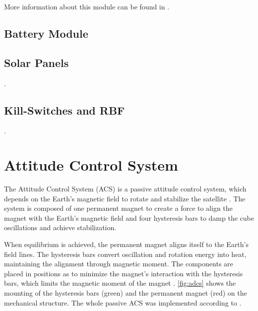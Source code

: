More information about this module can be found in \cite{eps2}.

\subsection{Battery Module}

\cite{bat4c}

\subsection{Solar Panels}

.

\subsection{Kill-Switches and RBF}

.

\section{Attitude Control System}

The Attitude Control System (ACS) is a passive attitude control system, which depends on the Earth's magnetic field to rotate and stabilize the satellite \cite{santoni2009,gerhardt2010}. The system is composed of one permanent magnet to create a force to align the magnet with the Earth's magnetic field and four hysteresis bars to damp the cube oscillations and achieve stabilization.

When equilibrium is achieved, the permanent magnet aligns itself to the Earth's field lines. The hysteresis bars convert oscillation and rotation energy into heat, maintaining the alignment through magnetic moment. The components are placed in positions as to minimize the magnet's interaction with the hysteresis bars, which limits the magnetic moment of the magnet \cite{francois2010}. \autoref{fig:adcs} shows the mounting of the hysteresis bars (green) and the permanent magnet (red) on the mechanical structure. The whole passive ACS was implemented according to \cite{francois2010}.

